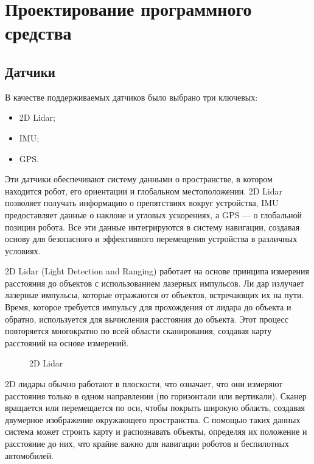 \def \statemodule {MotionEstimation}
\def \handleevent {Алгоритм обработки событий}



\section{Проектирование программного средства}
\subsection{Датчики}
В качестве поддерживаемых датчиков было выбрано три ключевых:
\begin{itemize}
	\item 2D Lidar;
	\item IMU;
	\item GPS.
\end{itemize}

Эти датчики обеспечивают систему данными о пространстве, в котором находится
робот, его ориентации и глобальном местоположении.
2D Lidar позволяет получать информацию о препятствиях вокруг устройства, IMU
предоставляет данные о наклоне и угловых ускорениях, а GPS — о глобальной
позиции робота. Все эти данные интегрируются в систему навигации, создавая
основу для безопасного и эффективного перемещения устройства в различных
условиях.

2D Lidar (Light Detection and Ranging) работает на основе принципа измерения
расстояния до объектов с использованием лазерных импульсов. Ли дар излучает
лазерные импульсы, которые отражаются от объектов, встречающих их на пути.
Время, которое требуется импульсу для прохождения от лидара до объекта и
обратно, используется для вычисления расстояния до объекта. Этот процесс
повторяется многократно по всей области сканирования, создавая карту расстояний
на основе измерений.

\begin{figure}[h]
\centering
\caption{2D Lidar}
\end{figure}

2D лидары обычно работают в плоскости, что означает, что они измеряют расстояния
только в одном направлении (по горизонтали или вертикали). Сканер вращается или
перемещается по оси, чтобы покрыть широкую область, создавая двумерное
изображение окружающего пространства. С помощью таких данных система может
строить карту и распознавать объекты, определяя их положение и расстояние до
них, что крайне важно для навигации роботов и беспилотных автомобилей.

